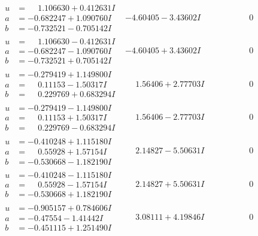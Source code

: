 \documentclass[1p]{elsarticle_modified}
\theoremstyle{definition}
\begin{document}
$$\begin{array}{c|c|c}
\begin{aligned}
u &= \phantom{-}1.106630 + 0.412631 I \\
a &= -0.682247 + 1.090760 I \\
b &= -0.732521 - 0.705142 I\end{aligned}
 & -4.60405 - 3.43602 I & \phantom{-0.000000 } 0 \\ \hline\begin{aligned}
u &= \phantom{-}1.106630 - 0.412631 I \\
a &= -0.682247 - 1.090760 I \\
b &= -0.732521 + 0.705142 I\end{aligned}
 & -4.60405 + 3.43602 I & \phantom{-0.000000 } 0 \\ \hline\begin{aligned}
u &= -0.279419 + 1.149800 I \\
a &= \phantom{-}0.11153 - 1.50317 I \\
b &= \phantom{-}0.229769 + 0.683294 I\end{aligned}
 & \phantom{-}1.56406 + 2.77703 I & \phantom{-0.000000 } 0 \\ \hline\begin{aligned}
u &= -0.279419 - 1.149800 I \\
a &= \phantom{-}0.11153 + 1.50317 I \\
b &= \phantom{-}0.229769 - 0.683294 I\end{aligned}
 & \phantom{-}1.56406 - 2.77703 I & \phantom{-0.000000 } 0 \\ \hline\begin{aligned}
u &= -0.410248 + 1.115180 I \\
a &= \phantom{-}0.55928 + 1.57154 I \\
b &= -0.530668 - 1.182190 I\end{aligned}
 & \phantom{-}2.14827 - 5.50631 I & \phantom{-0.000000 } 0 \\ \hline\begin{aligned}
u &= -0.410248 - 1.115180 I \\
a &= \phantom{-}0.55928 - 1.57154 I \\
b &= -0.530668 + 1.182190 I\end{aligned}
 & \phantom{-}2.14827 + 5.50631 I & \phantom{-0.000000 } 0 \\ \hline\begin{aligned}
u &= -0.905157 + 0.784606 I \\
a &= -0.47554 - 1.41442 I \\
b &= -0.451115 + 1.251490 I\end{aligned}
 & \phantom{-}3.08111 + 4.19846 I & \phantom{-0.000000 } 0 \\ \hline\begin{aligned}

\end{aligned}
\end{array}$$
\end{document}
